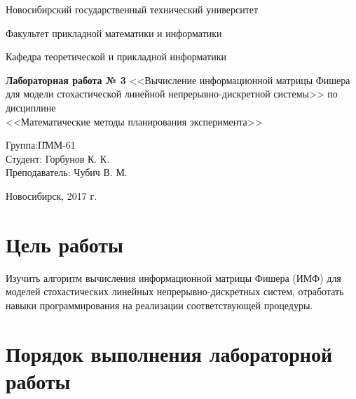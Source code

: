 \documentclass[a4paper,14pt]{extarticle}
\begin{document}
\setcounter{secnumdepth}{0}

\begin{titlepage}

  \begin{center}
    Новосибирский государственный технический университет
    
    Факультет прикладной математики и информатики
    
    Кафедра теоретической и прикладной информатики
    
    \vspace{250pt}
    
    \textbf{\Large{Лабораторная работа № 3}}
    \medbreak
		<<Вычисление информационной матрицы Фишера для модели стохастической
		линейной непрерывно-дискретной системы>>
		\medbreak 
		по дисциплине \\
    \medbreak
    <<Математические методы планирования эксперимента>>
    \vspace{100pt}
  \end{center}

  \begin{flushleft}
    \begin{tabbing}
      Группа:\qquad\qquad \= ПММ-61\\
      Студент:            \> Горбунов К. К.\\
      Преподаватель:      \> Чубич В. М.\\
    \end{tabbing}
  \end{flushleft}

  \begin{center}
    \vspace{\fill}
    Новосибирск, 2017 г.
  \end{center}

\end{titlepage}

\newpage

\tableofcontents

\newpage

\section{Цель работы}

Изучить алгоритм вычисления информационной матрицы Фишера (ИМФ) для моделей
стохастических линейных непрерывно-дискретных систем, отработать навыки
программирования на реализации соответствующей процедуры.

\section{Порядок выполнения лабораторной работы}
\end{document}

